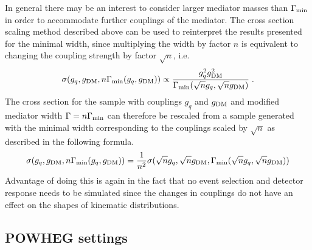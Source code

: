 In general there may be an interest to consider larger mediator masses than $\Gamma_{\rm{min}}$ in order to accommodate further couplings of the mediator. The cross section scaling method described above can be used to reinterpret the results presented for the minimal width, since multiplying the width by factor $n$ is equivalent to changing the coupling strength by factor $\sqrt{n}$, i.e.
\begin{equation}
\sigma(g_q,g_{\rm{DM}}, n\Gamma_{\rm{min}}(g_q,g_{\rm{DM}})) \propto \frac{g_q^2 g_{\rm{DM}}^2}{\Gamma_{\rm{min}}(\sqrt{n}g_q,\sqrt{n}g_{\rm{DM}})} \;.
\end{equation}
The cross section for the sample with couplings $g_q$ and $g_{\rm{DM}}$ and modified mediator width $\Gamma = n\Gamma_{\rm{min}}$ can therefore be rescaled from a sample generated with the minimal width corresponding to the couplings scaled by $\sqrt{n}$ as described in the following formula.
\begin{equation}
\sigma(g_q,g_{\rm{DM}}, n\Gamma_{\rm{min}}(g_q,g_{\rm{DM}})) = \frac{1}{n^2} \sigma(\sqrt{n}g_q,\sqrt{n}g_{\rm{DM}},\Gamma_{\rm{min}}(\sqrt{n}g_q,\sqrt{n}g_{\rm{DM}}))
\end{equation}
Advantage of doing this is again in the fact that no event selection and detector response needs to be simulated since the changes in couplings do not have an effect on the shapes of kinematic distributions.




\subsection{POWHEG settings}

